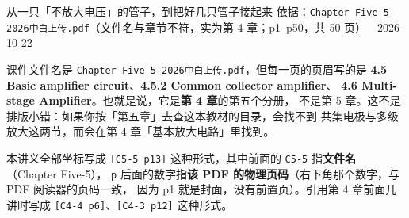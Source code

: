 \documentclass[11pt]{ctexart}
\begin{document}
{从一只「不放大电压」的管子，到把好几只管子接起来}
{依据：\texttt{Chapter Five-5-2026中白上传.pdf}（文件名与章节不符，实为第 4 章；p1--p50，共 50 页）\ \textperiodcentered\ 2026-10-22}



课件文件名是 \texttt{Chapter Five-5-2026中白上传.pdf}，但每一页的页眉写的是
\textbf{4.5 Basic amplifier circuit}、\textbf{4.5.2 Common collector amplifier}、
\textbf{4.6 Multi-stage Amplifier}。也就是说，它是\textbf{第 4 章}的第五个分册，
不是第 5 章。这不是排版小错：如果你按「第五章」去查这本教材的目录，会找不到
共集电极与多级放大这两节，而会在第 4 章「基本放大电路」里找到。

本讲义全部坐标写成 \texttt{[C5-5 p13]} 这种形式，其中前面的 \texttt{C5-5} 指\textbf{文件名}（Chapter Five-5），
\texttt{p} 后面的数字指\textbf{该 PDF 的物理页码}（右下角那个数字，与 PDF 阅读器的页码一致，
因为 p1 就是封面，没有前置页）。引用第 4 章前面几讲时写成 \texttt{[C4-4 p6]}、\texttt{[C4-3 p12]} 这种形式。

\end{document}
